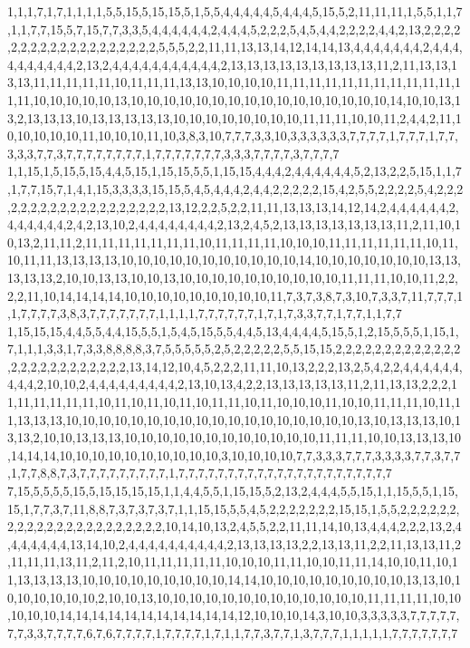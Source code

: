 1,1,1,7,1,7,1,1,1,1,5,5,15,5,15,15,5,1,5,5,4,4,4,4,4,5,4,4,4,5,15,5,2,11,11,11,1,5,5,1,1,7,1,1,7,7,15,5,7,15,7,7,3,3,5,4,4,4,4,4,4,2,4,4,4,5,2,2,2,5,4,5,4,4,2,2,2,2,4,4,2,13,2,2,2,2,2,2,2,2,2,2,2,2,2,2,2,2,2,2,2,5,5,5,2,2,11,11,13,13,14,12,14,14,13,4,4,4,4,4,4,4,2,4,4,4,4,4,4,4,4,4,4,2,13,2,4,4,4,4,4,4,4,4,4,4,4,2,13,13,13,13,13,13,13,13,13,11,2,11,13,13,13,13,11,11,11,11,11,10,11,11,11,13,13,10,10,10,10,11,11,11,11,11,11,11,11,11,11,11,11,11,10,10,10,10,10,13,10,10,10,10,10,10,10,10,10,10,10,10,10,10,10,10,14,10,10,13,13,2,13,13,13,10,13,13,13,13,13,10,10,10,10,10,10,10,10,11,11,11,10,10,11,2,4,4,2,11,10,10,10,10,10,11,10,10,10,11,10,3,8,3,10,7,7,7,3,3,10,3,3,3,3,3,3,7,7,7,7,1,7,7,7,1,7,7,3,3,3,7,7,3,7,7,7,7,7,7,7,7,1,7,7,7,7,7,7,7,3,3,3,7,7,7,7,3,7,7,7,7
1,1,15,1,5,15,5,15,4,4,5,15,1,15,15,5,5,1,15,15,4,4,4,2,4,4,4,4,4,4,5,2,13,2,2,5,15,1,1,7,1,7,7,15,7,1,4,1,15,3,3,3,3,15,15,5,4,5,4,4,4,2,4,4,2,2,2,2,2,15,4,2,5,5,2,2,2,2,5,4,2,2,2,2,2,2,2,2,2,2,2,2,2,2,2,2,2,2,2,13,12,2,2,5,2,2,11,11,13,13,13,14,12,14,2,4,4,4,4,4,4,2,4,4,4,4,4,4,2,4,2,13,10,2,4,4,4,4,4,4,4,4,2,13,2,4,5,2,13,13,13,13,13,13,13,11,2,11,10,10,13,2,11,11,2,11,11,11,11,11,11,11,10,11,11,11,11,10,10,10,11,11,11,11,11,11,10,11,10,11,11,13,13,13,13,10,10,10,10,10,10,10,10,10,10,10,14,10,10,10,10,10,10,10,13,13,13,13,13,2,10,10,13,13,10,10,13,10,10,10,10,10,10,10,10,10,10,11,11,11,10,10,11,2,2,2,2,11,10,14,14,14,14,10,10,10,10,10,10,10,10,10,11,7,3,7,3,8,7,3,10,7,3,3,7,11,7,7,7,1,1,7,7,7,7,3,8,3,7,7,7,7,7,7,7,1,1,1,1,7,7,7,7,7,7,1,7,1,7,3,3,7,7,1,7,7,1,1,7,7
1,15,15,15,4,4,5,5,4,4,15,5,5,1,5,4,5,15,5,5,4,4,5,13,4,4,4,4,5,15,5,1,2,15,5,5,5,1,15,1,7,1,1,1,3,3,1,7,3,3,8,8,8,8,3,7,5,5,5,5,5,2,5,2,2,2,2,2,5,5,15,15,2,2,2,2,2,2,2,2,2,2,2,2,2,2,2,2,2,2,2,2,2,2,2,2,2,13,14,12,10,4,5,2,2,2,11,11,10,13,2,2,2,13,2,5,4,2,2,4,4,4,4,4,4,4,4,4,2,10,10,2,4,4,4,4,4,4,4,4,4,2,13,10,13,4,2,2,13,13,13,13,13,11,2,11,13,13,2,2,2,11,11,11,11,11,11,10,11,10,11,10,11,10,11,11,10,11,10,10,10,11,10,10,11,11,11,10,11,11,13,13,13,10,10,10,10,10,10,10,10,10,10,10,10,10,10,10,10,10,10,13,10,13,13,13,10,13,13,2,10,10,13,13,13,10,10,10,10,10,10,10,10,10,10,10,10,11,11,11,10,10,13,13,13,10,14,14,14,10,10,10,10,10,10,10,10,10,10,3,10,10,10,10,7,7,3,3,3,7,7,7,3,3,3,3,7,7,3,7,7,1,7,7,8,8,7,3,7,7,7,7,7,7,7,7,7,1,7,7,7,7,7,7,7,7,7,7,7,7,7,7,7,7,7,7,7,7,7,7
7,15,5,5,5,5,15,5,15,15,15,15,1,1,4,4,5,5,1,15,15,5,2,13,2,4,4,4,5,5,15,1,1,15,5,5,1,15,15,1,7,7,3,7,11,8,8,7,3,7,3,7,3,7,1,1,15,15,5,5,4,5,2,2,2,2,2,2,2,15,15,1,5,5,2,2,2,2,2,2,2,2,2,2,2,2,2,2,2,2,2,2,2,2,2,2,10,14,10,13,2,4,5,5,2,2,11,11,14,10,13,4,4,4,2,2,2,13,2,4,4,4,4,4,4,4,13,14,10,2,4,4,4,4,4,4,4,4,4,4,2,13,13,13,13,2,2,13,13,11,2,2,11,13,13,11,2,11,11,11,13,11,2,11,2,10,11,11,11,11,11,10,10,10,11,11,10,10,11,11,14,10,10,11,10,11,13,13,13,13,10,10,10,10,10,10,10,10,10,14,14,10,10,10,10,10,10,10,10,10,13,13,10,10,10,10,10,10,10,2,10,10,13,10,10,10,10,10,10,10,10,10,10,10,10,10,11,11,11,11,10,10,10,10,10,14,14,14,14,14,14,14,14,14,14,14,12,10,10,10,14,3,10,10,3,3,3,3,3,7,7,7,7,7,7,7,3,3,7,7,7,7,6,7,6,7,7,7,7,1,7,7,7,7,1,7,1,1,7,7,3,7,7,1,3,7,7,7,1,1,1,1,1,7,7,7,7,7,7,7
